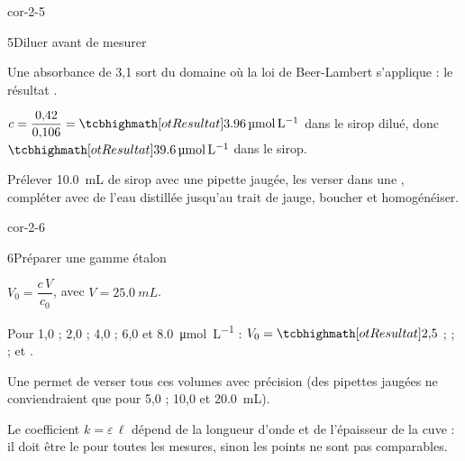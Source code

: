 \begin{blocLivre}{cor-2-5}
\begin{corrige}{5}{Diluer avant de mesurer}
\begin{questions}
\item Une absorbance de 3,1 sort du domaine où la loi de Beer-Lambert s'applique : le résultat .
\item $c=\dfrac{0{,}42}{0{,}106}=\res{\qty{3,96}{\micro mol.L^{-1}}}$ dans le sirop dilué, donc $\res{\qty{39,6}{\micro mol.L^{-1}}}$ dans le sirop.
\item Prélever \qty{10,0}{mL} de sirop avec une pipette jaugée, les verser dans une , compléter avec de l'eau
distillée jusqu'au trait de jauge, boucher et homogénéiser.
\end{questions}
\end{corrige}
\end{blocLivre}
\begin{blocLivre}{cor-2-6}
\begin{corrige}{6}{Préparer une gamme étalon}
\begin{questions}
\item $V_0=\dfrac{c\,V}{c_0}$, avec $V=\qty{25,0}{mL}$.
\item Pour 1,0 ; 2,0 ; 4,0 ; 6,0 et \qty{8,0}{\micro mol.L^{-1}} : $V_0=\res{2{,}5}$ ;  ;  ;  et .
\item Une  permet de verser tous ces volumes avec précision (des pipettes jaugées ne conviendraient
que pour 5,0 ; 10,0 et \qty{20,0}{mL}).
\item Le coefficient $k=\varepsilon\,\ell$ dépend de la longueur d'onde et de l'épaisseur de la cuve : il doit être le  pour toutes les
mesures, sinon les points ne sont pas comparables.
\end{questions}
\end{corrige}
\end{blocLivre}
